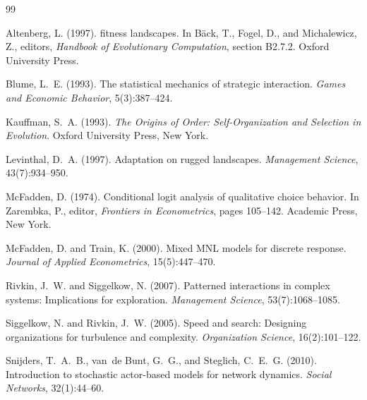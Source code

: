 \documentclass[12pt]{article}
\begin{document}
\begin{thebibliography}{99}

Altenberg, L. (1997).
 fitness landscapes.
\newblock In B\"ack, T., Fogel, D., and Michalewicz, Z., editors,
  \emph{Handbook of Evolutionary Computation}, section B2.7.2.
  Oxford University Press.

Blume, L.~E. (1993).
\newblock The statistical mechanics of strategic interaction.
\newblock \emph{Games and Economic Behavior}, 5(3):387--424.

Kauffman, S.~A. (1993).
\newblock \emph{The Origins of Order: Self-Organization and Selection in
  Evolution}.
\newblock Oxford University Press, New York.

Levinthal, D.~A. (1997).
\newblock Adaptation on rugged landscapes.
\newblock \emph{Management Science}, 43(7):934--950.

McFadden, D. (1974).
\newblock Conditional logit analysis of qualitative choice behavior.
\newblock In Zarembka, P., editor, \emph{Frontiers in Econometrics},
  pages 105--142. Academic Press, New York.

McFadden, D. and Train, K. (2000).
\newblock Mixed {MNL} models for discrete response.
\newblock \emph{Journal of Applied Econometrics}, 15(5):447--470.

Rivkin, J.~W. and Siggelkow, N. (2007).
\newblock Patterned interactions in complex systems: Implications for
  exploration.
\newblock \emph{Management Science}, 53(7):1068--1085.

Siggelkow, N. and Rivkin, J.~W. (2005).
\newblock Speed and search: Designing organizations for turbulence and
  complexity.
\newblock \emph{Organization Science}, 16(2):101--122.

Snijders, T.~A.~B., van~de Bunt, G.~G., and Steglich, C.~E.~G. (2010).
\newblock Introduction to stochastic actor-based models for network dynamics.
\newblock \emph{Social Networks}, 32(1):44--60.

\end{thebibliography}
\end{document}
